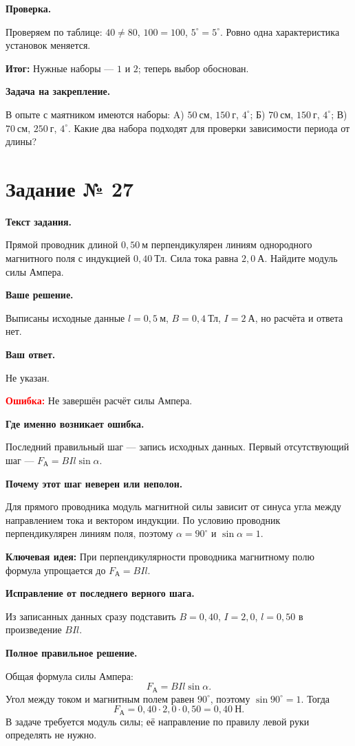 \documentclass[11pt,a4paper]{article}
\newcommand{\reviewblock}[2]{\par\medskip\noindent\textbf{#1}\par\noindent#2\par}
\newcommand{\errorblock}[1]{\par\medskip\noindent\textcolor{red}{\textbf{Ошибка:}} #1\par}
\newcommand{\ideablock}[1]{\par\medskip\noindent\textcolor{blue!60!black}{\textbf{Ключевая идея:}} #1\par}
\newcommand{\resultblock}[1]{\par\medskip\noindent\textcolor{teal!60!black}{\textbf{Итог:}} #1\par}
\begin{document}
\reviewblock{Проверка.}{Проверяем по таблице: $40\ne80$, $100=100$, $5^\circ=5^\circ$. Ровно одна характеристика установок меняется.}

\resultblock{Нужные наборы --- $1$ и $2$; теперь выбор обоснован.}

\reviewblock{Задача на закрепление.}{В опыте с маятником имеются наборы: A) $50\ \text{см}$, $150\ \text{г}$, $4^\circ$; Б) $70\ \text{см}$, $150\ \text{г}$, $4^\circ$; В) $70\ \text{см}$, $250\ \text{г}$, $4^\circ$. Какие два набора подходят для проверки зависимости периода от длины?}
\newpage
{}\label{task:27}

\section*{Задание № 27}

\reviewblock{Текст задания.}{Прямой проводник длиной $0{,}50\ \text{м}$ перпендикулярен линиям однородного магнитного поля с индукцией $0{,}40\ \text{Тл}$. Сила тока равна $2{,}0\ \text{А}$. Найдите модуль силы Ампера.}

\reviewblock{Ваше решение.}{Выписаны исходные данные $l=0{,}5\ \text{м}$, $B=0{,}4\ \text{Тл}$, $I=2\ \text{А}$, но расчёта и ответа нет.}

\reviewblock{Ваш ответ.}{Не указан.}

\errorblock{Не завершён расчёт силы Ампера.}

\reviewblock{Где именно возникает ошибка.}{Последний правильный шаг --- запись исходных данных. Первый отсутствующий шаг --- $F_{\text{А}}=BIl\sin\alpha$.}

\reviewblock{Почему этот шаг неверен или неполон.}{Для прямого проводника модуль магнитной силы зависит от синуса угла между направлением тока и вектором индукции. По условию проводник перпендикулярен линиям поля, поэтому $\alpha=90^\circ$ и $\sin\alpha=1$.}

\ideablock{При перпендикулярности проводника магнитному полю формула упрощается до $F_{\text{А}}=BIl$.}

\reviewblock{Исправление от последнего верного шага.}{Из записанных данных сразу подставить $B=0{,}40$, $I=2{,}0$, $l=0{,}50$ в произведение $BIl$.}

\reviewblock{Полное правильное решение.}{Общая формула силы Ампера:
\[F_{\text{А}}=BIl\sin\alpha.\]
Угол между током и магнитным полем равен $90^\circ$, поэтому $\sin90^\circ=1$. Тогда
\[F_{\text{А}}=0{,}40\cdot2{,}0\cdot0{,}50=0{,}40\ \text{Н}.\]
В задаче требуется модуль силы; её направление по правилу левой руки определять не нужно.}
\end{document}
